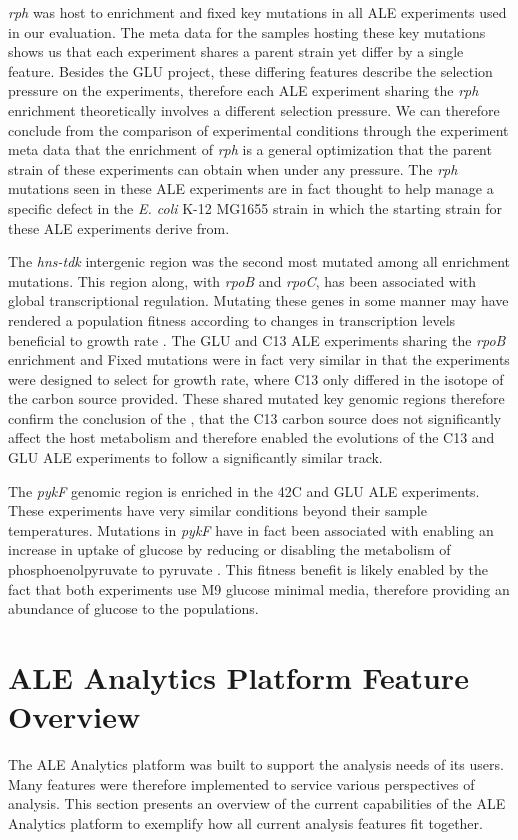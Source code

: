 \documentclass[12pt,final,masters,chapterheads]{ucsd}  %
\begin{document}
\textit{rph} was host to enrichment and fixed key mutations in all ALE experiments used in our evaluation. The meta data for the samples hosting these key mutations shows us that each experiment shares a parent strain yet differ by a single feature. Besides the GLU project, these differing features describe the selection pressure on the experiments, therefore each ALE experiment sharing the \textit{rph} enrichment theoretically involves a different selection pressure. We can therefore conclude from the comparison of experimental conditions through the experiment meta data that the enrichment of \textit{rph} is a general optimization that the parent strain of these experiments can obtain when under any pressure. The \textit{rph} mutations seen in these ALE experiments are in fact thought to help manage a specific defect in the \textit{E. coli} K-12 MG1655 strain in which the starting strain for these ALE experiments derive from\cite{Conrad2009}.

The \textit{hns-tdk} intergenic region was the second most mutated among all enrichment mutations. This region along, with \textit{rpoB} and \textit{rpoC}, has been associated with global transcriptional regulation. Mutating these genes in some manner may have rendered a population fitness according to changes in transcription levels beneficial to growth rate \cite{Kobayashi01011990, AYERS1989749, Cheng2014, Wang1445}. The GLU and C13 ALE experiments sharing the \textit{rpoB} enrichment and Fixed mutations were in fact very similar in that the experiments were designed to select for growth rate, where C13 only differed in the isotope of the carbon source provided. These shared mutated key genomic regions therefore confirm the conclusion of the \cite{pmid26964043}, that the C13 carbon source does not significantly affect the host metabolism and therefore enabled the evolutions of the C13 and GLU ALE experiments to follow a significantly similar track.

The \textit{pykF} genomic region is enriched in the 42C and GLU ALE experiments. These experiments have very similar conditions beyond their sample temperatures. Mutations in \textit{pykF} have in fact been associated with enabling an increase in uptake of glucose by reducing or disabling the metabolism of phosphoenolpyruvate to pyruvate \cite{Woods13062006, 10.1371/journal.pgen.1001164, Blank25022014}. This fitness benefit is likely enabled by the fact that both experiments use M9 glucose minimal media, therefore providing an abundance of glucose to the populations.
\section{ALE Analytics Platform Feature Overview}
The ALE Analytics platform was built to support the analysis needs of its users. Many features were therefore implemented to service various perspectives of analysis. This section presents an overview of the current capabilities of the ALE Analytics platform to exemplify how all current analysis features fit together.
\end{document}
